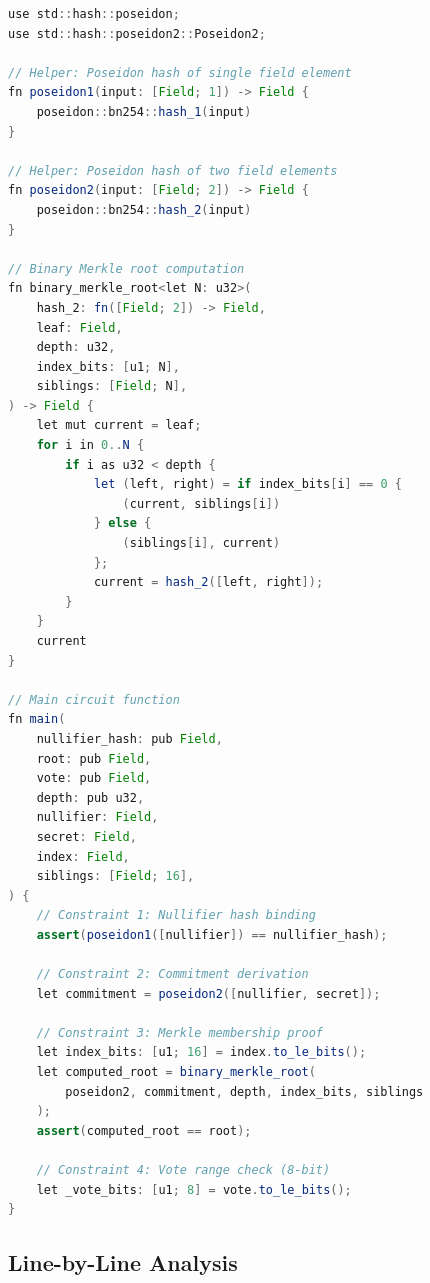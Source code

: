 \begin{lstlisting}[language=Java, caption={Complete Noir ZK voting circuit (main.nr).}, label={lst:circuit}]
use std::hash::poseidon;
use std::hash::poseidon2::Poseidon2;

// Helper: Poseidon hash of single field element
fn poseidon1(input: [Field; 1]) -> Field {
    poseidon::bn254::hash_1(input)
}

// Helper: Poseidon hash of two field elements
fn poseidon2(input: [Field; 2]) -> Field {
    poseidon::bn254::hash_2(input)
}

// Binary Merkle root computation
fn binary_merkle_root<let N: u32>(
    hash_2: fn([Field; 2]) -> Field,
    leaf: Field,
    depth: u32,
    index_bits: [u1; N],
    siblings: [Field; N],
) -> Field {
    let mut current = leaf;
    for i in 0..N {
        if i as u32 < depth {
            let (left, right) = if index_bits[i] == 0 {
                (current, siblings[i])
            } else {
                (siblings[i], current)
            };
            current = hash_2([left, right]);
        }
    }
    current
}

// Main circuit function
fn main(
    nullifier_hash: pub Field,
    root: pub Field,
    vote: pub Field,
    depth: pub u32,
    nullifier: Field,
    secret: Field,
    index: Field,
    siblings: [Field; 16],
) {
    // Constraint 1: Nullifier hash binding
    assert(poseidon1([nullifier]) == nullifier_hash);
    
    // Constraint 2: Commitment derivation
    let commitment = poseidon2([nullifier, secret]);
    
    // Constraint 3: Merkle membership proof
    let index_bits: [u1; 16] = index.to_le_bits();
    let computed_root = binary_merkle_root(
        poseidon2, commitment, depth, index_bits, siblings
    );
    assert(computed_root == root);
    
    // Constraint 4: Vote range check (8-bit)
    let _vote_bits: [u1; 8] = vote.to_le_bits();
}
\end{lstlisting}

\subsection{Line-by-Line Analysis}

